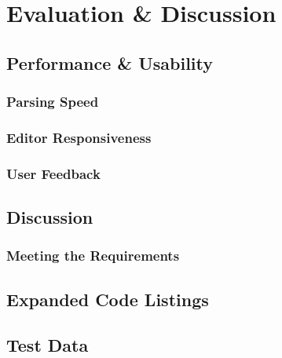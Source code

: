 \documentclass[11pt]{report}
\begin{document}
\part{Evaluation \& Discussion}

\chapter{Performance \& Usability}
\section{Parsing Speed}
\section{Editor Responsiveness}
\section{User Feedback}

\chapter{Discussion}
\section{Meeting the Requirements}

\printbibliography

\appendix


\chapter{Expanded Code Listings}

\chapter{Test Data}
\end{document}
